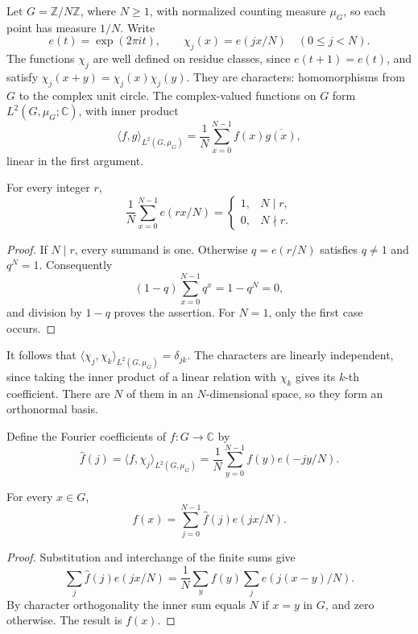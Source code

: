 \label{finite-circle-frequencies}

Let $G=\mathbb Z/N\mathbb Z$, where $N\geq1$, with normalized counting measure $\mu_G$, so each point has measure $1/N$. Write
\[
e(t)=\exp(2\pi i t),\qquad
\chi_j(x)=e(jx/N)\quad(0\leq j<N).
\]
The functions $\chi_j$ are well defined on residue classes, since $e(t+1)=e(t)$, and satisfy $\chi_j(x+y)=\chi_j(x)\chi_j(y)$. They are characters: homomorphisms from $G$ to the complex unit circle. The complex-valued functions on $G$ form $L^2(G,\mu_G;\mathbb C)$, with inner product
\[
\langle f,g\rangle_{L^2(G,\mu_G)}=\frac1N\sum_{x=0}^{N-1}f(x)\overline{g(x)},
\]
linear in the first argument.

\begin{lemma}\label{finite-character-orthogonality}
For every integer $r$,
\[
\frac1N\sum_{x=0}^{N-1}e(rx/N)
=\begin{cases}1,&N\mid r,\\0,&N\nmid r.\end{cases}
\]
\end{lemma}

\begin{proof}
If $N\mid r$, every summand is one. Otherwise $q=e(r/N)$ satisfies $q\ne1$ and $q^N=1$. Consequently
\[
(1-q)\sum_{x=0}^{N-1}q^x=1-q^N=0,
\]
and division by $1-q$ proves the assertion. For $N=1$, only the first case occurs.
\end{proof}

It follows that $\langle\chi_j,\chi_k\rangle_{L^2(G,\mu_G)}=\delta_{jk}$. The characters are linearly independent, since taking the inner product of a linear relation with $\chi_k$ gives its $k$-th coefficient. There are $N$ of them in an $N$-dimensional space, so they form an orthonormal basis.

\begin{definition}\label{finite-fourier-coefficients}
Define the Fourier coefficients of $f:G\to\mathbb C$ by
\[
\widehat f(j)=\langle f,\chi_j\rangle_{L^2(G,\mu_G)}
=\frac1N\sum_{y=0}^{N-1}f(y)e(-jy/N).
\]
\end{definition}

\begin{proposition}\label{finite-fourier-inversion}
For every $x\in G$,
\[
f(x)=\sum_{j=0}^{N-1}\widehat f(j)e(jx/N).
\]
\end{proposition}

\begin{proof}
Substitution and interchange of the finite sums give
\[
\sum_j\widehat f(j)e(jx/N)
=\frac1N\sum_y f(y)\sum_j e(j(x-y)/N).
\]
By character orthogonality the inner sum equals $N$ if $x=y$ in $G$, and zero otherwise. The result is $f(x)$.
\end{proof}

